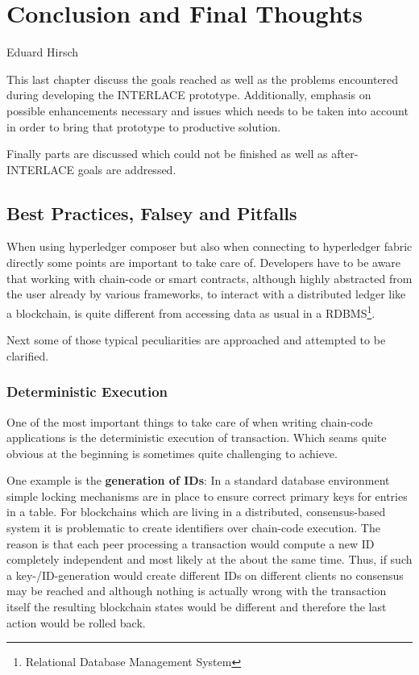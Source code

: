 \chapter{Conclusion and Final Thoughts}
\label{ch:conclusion}

\vspace{-1cm}
\begin{center}
Eduard Hirsch
\end{center}

This last chapter discuss the goals reached as well as the problems encountered during developing the INTERLACE prototype. Additionally, emphasis on possible enhancements necessary and issues which needs to be taken into account in order to bring that prototype to productive solution.

Finally parts are discussed which could not be finished as well as after-INTERLACE goals are addressed.

\section{Best Practices, Falsey and Pitfalls}

When using hyperledger composer but also when connecting to hyperledger fabric directly some points are important to take care of. Developers have to be aware that working with chain-code or smart contracts, although highly abstracted from the user already by various frameworks, to interact with a distributed ledger like a blockchain, is quite different from accessing data as usual in a RDBMS\footnote{Relational Database Management System}.

Next some of those typical peculiarities are approached and attempted to be clarified.

\subsection{Deterministic Execution}

One of the most important things to take care of when writing chain-code applications is the deterministic execution of transaction. Which seams quite obvious at the beginning is sometimes quite challenging to achieve.

One example is the \textbf{generation of IDs}:  In a standard database environment simple locking mechanisms are in place to ensure correct primary keys for entries in a table. For blockchains  which are living in a distributed, consensus-based system it is problematic to create identifiers over chain-code execution. The reason is that each peer processing a transaction would compute a new ID completely independent and most likely at the about the same time. Thus, if such a key-/ID-generation would create different IDs on different clients no consensus may be reached and although nothing is actually wrong with the transaction itself the resulting blockchain states would be different and therefore the last action would be rolled back.

